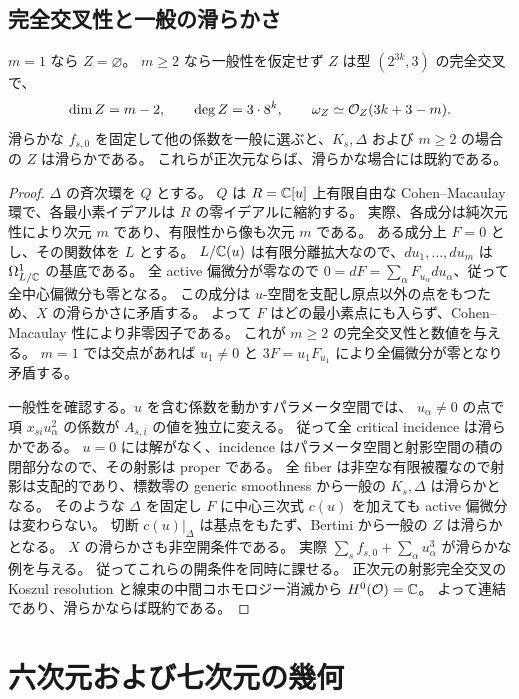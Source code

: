 \subsection{完全交叉性と一般の滑らかさ}
\begin{proposition}\label{prop:pg-zero-ci}
$m=1$ なら $Z=\varnothing$。
$m\geq2$ なら一般性を仮定せず $Z$ は型 $(2^{3k},3)$ の完全交叉で、
\[
\dim Z=m-2,\qquad \deg Z=3\cdot8^k,\qquad
\omega_Z\simeq\mathcal O_Z(3k+3-m).
\]
滑らかな $f_{s,0}$ を固定して他の係数を一般に選ぶと、$K_s,\Delta$ および $m\geq2$ の場合の $Z$ は滑らかである。
これらが正次元ならば、滑らかな場合には既約である。
\end{proposition}
\begin{proof}
$\Delta$ の斉次環を $Q$ とする。
$Q$ は $R=\mathbb C[u]$ 上有限自由な Cohen--Macaulay 環で、各最小素イデアルは $R$ の零イデアルに縮約する。
実際、各成分は純次元性により次元 $m$ であり、有限性から像も次元 $m$ である。
ある成分上 $F=0$ とし、その関数体を $L$ とする。
$L/\mathbb C(u)$ は有限分離拡大なので、$du_1,\ldots,du_m$ は $\Omega^1_{L/\mathbb C}$ の基底である。
全 active 偏微分が零なので
$0=dF=\sum_\alpha F_{u_\alpha}du_\alpha$、従って全中心偏微分も零となる。
この成分は $u$-空間を支配し原点以外の点をもつため、$X$ の滑らかさに矛盾する。
よって $F$ はどの最小素点にも入らず、Cohen--Macaulay 性により非零因子である。
これが $m\geq2$ の完全交叉性と数値を与える。
$m=1$ では交点があれば $u_1\neq0$ と $3F=u_1F_{u_1}$ により全偏微分が零となり矛盾する。

一般性を確認する。$u$ を含む係数を動かすパラメータ空間では、
$u_\alpha\neq0$ の点で項 $x_{si}u_\alpha^2$ の係数が $A_{s,i}$ の値を独立に変える。
従って全 critical incidence は滑らかである。
$u=0$ には解がなく、incidence はパラメータ空間と射影空間の積の閉部分なので、その射影は proper である。
全 fiber は非空な有限被覆なので射影は支配的であり、標数零の generic smoothness から一般の $K_s,\Delta$ は滑らかとなる。
そのような $\Delta$ を固定し $F$ に中心三次式 $c(u)$ を加えても active 偏微分は変わらない。
切断 $c(u)|_\Delta$ は基点をもたず、Bertini から一般の $Z$ は滑らかとなる。
$X$ の滑らかさも非空開条件である。
実際 $\sum_sf_{s,0}+\sum_\alpha u_\alpha^3$ が滑らかな例を与える。
従ってこれらの開条件を同時に課せる。
正次元の射影完全交叉の Koszul resolution と線束の中間コホモロジー消滅から $H^0(\mathcal O)=\mathbb C$。
よって連結であり、滑らかならば既約である。
\end{proof}

\section{六次元および七次元の幾何}\label{sec:pg-six-seven}
